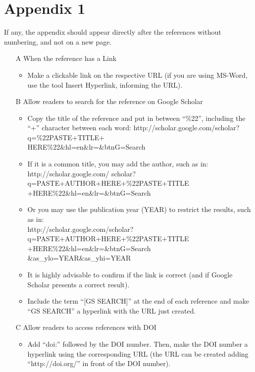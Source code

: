 \documentclass[english,brazilian]{RBIEarticle} %
\begin{document}

\nocite{Baker2011}
\nocite{Seffrin2013}
\nocite{Brasil2008}
\nocite{Kautzman2015}
\nocite{Sweller1991}
\nocite{Clark2006}
\nocite{Mason2012}

 

\section*{Appendix 1}
\label{apendice1}

If any, the appendix should appear directly after the references without numbering, and not on a new page.

\begin{enumerate}
    \item[A] When the reference has a Link
    \begin{itemize}
        \item Make a clickable link on the respective URL (if you are using MS-Word, use the tool Insert Hyperlink, informing the URL).
    \end{itemize}
    \item[B] Allow readers to search for the reference on Google Scholar
    \begin{itemize}
        \item Copy the title of the reference and put in between ``\%22'', including the ``+'' character between each word: http://scholar.google.com/scholar?q=\%22PASTE+TITLE+\\HERE\%22\&hl=en\&lr=\&btnG=Search
        \item If it is a common title, you may add the author, such as in: \\http://scholar.google.com/ scholar?q=PASTE+AUTHOR+HERE+\%22PASTE+TITLE\\+HERE\%22\&hl=en\&lr=\&btnG=Search
        \item Or you may use the publication year (YEAR) to restrict the results, such as in:\\ http://scholar.google.com/scholar?
        q=PASTE+AUTHOR+HERE+\%22PASTE+TITLE\\+HERE\%22\&hl=en\&lr=\&btnG=Search \&as\_ylo=YEAR\&as\_yhi=YEAR
        \item It is highly advisable to confirm if the link is correct (and if Google Scholar presents a correct result).
        \item Include the term ``[GS SEARCH]'' at the end of each reference and make “GS SEARCH” a hyperlink with the URL just created.
    \end{itemize}
    \item[C] Allow readers to access references with DOI
    \begin{itemize}
        \item Add ``doi:'' followed by the DOI number. Then, make the DOI number a hyperlink using the corresponding URL (the URL can be created adding ``http://doi.org/'' in front of the DOI number).
    \end{itemize}
\end{enumerate}
\end{document}
